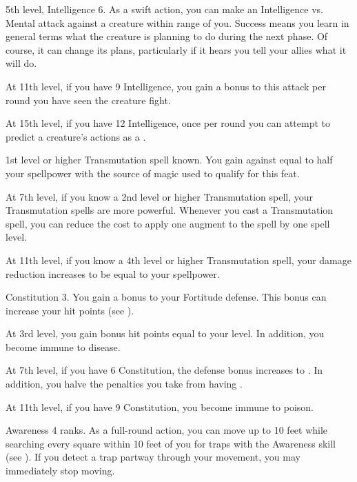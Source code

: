     \featpres 5th level, Intelligence 6.
    \featben As a swift action, you can make an Intelligence vs. Mental attack against a creature within \rngmed range of you.
    Success means you learn in general terms what the creature is planning to do during the next phase.
    Of course, it can change its plans, particularly if it hears you tell your allies what it will do.

    At 11th level, if you have 9 Intelligence, you gain a  bonus to this attack per round you have seen the creature fight.

    At 15th level, if you have 12 Intelligence, once per round you can attempt to predict a creature's actions as a .

    \featpre 1st level or higher Transmutation spell known.
    \featben You gain  against  equal to half your spellpower with the source of magic used to qualify for this feat.

    At 7th level, if you know a 2nd level or higher Transmutation spell, your Transmutation spells are more powerful.
    Whenever you cast a Transmutation spell, you can reduce the cost to apply one augment to the spell by one spell level.

    At 11th level, if you know a 4th level or higher Transmutation spell, your damage reduction increases to be equal to your spellpower.

    \featpre Constitution 3.
    \featben You gain a  bonus to your Fortitude defense.
    This bonus can increase your hit points (see ).

    At 3rd level, you gain bonus hit points equal to your level.
    In addition, you become immune to disease.

    At 7th level, if you have 6 Constitution, the defense bonus increases to .
    In addition, you halve the penalties you take from having .

    At 11th level, if you have 9 Constitution, you become immune to poison.

    \featpre Awareness 4 ranks.
    \featben As a full-round action, you can move up to 10 feet while searching every square within 10 feet of you for traps with the Awareness skill (see ).
    If you detect a trap partway through your movement, you may immediately stop moving.

